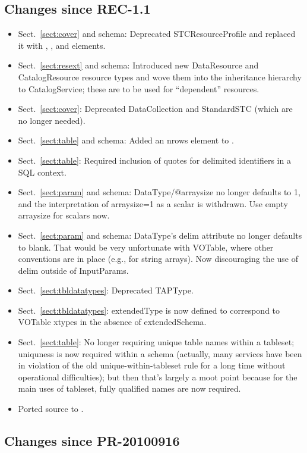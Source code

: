 \documentclass[11pt,a4paper]{ivoa}
\begin{document}
\subsection{Changes since REC-1.1}

\begin{itemize}
\item Sect.~\ref{sect:cover} and schema: Deprecated STCResourceProfile and replaced it with
, , and  elements.
\item Sect.~\ref{sect:resext} and schema: 
Introduced new DataResource and CatalogResource resource types
and wove them into the inheritance hierarchy to CatalogService; these
are to be used for ``dependent'' resources.
\item Sect.~\ref{sect:cover}:
Deprecated DataCollection and StandardSTC (which are no longer
needed).
\item Sect.~\ref{sect:table} 
and schema: Added an nrows element to .
\item Sect.~\ref{sect:table}: 
Required inclusion of quotes for delimited identifiers in a
SQL context.
\item Sect.~\ref{sect:param} and schema: 
DataType/@arraysize no longer defaults to 1, and the
interpretation of arraysize=1 as a scalar is withdrawn.  Use empty
arraysize for scalars now.
\item Sect.~\ref{sect:param} and schema:
DataType's delim attribute no longer defaults to blank.  That
would be very unfortunate with VOTable, where other conventions are in
place (e.g., for string arrays).  Now discouraging the use of delim
outside of InputParams.
\item Sect.~\ref{sect:tbldatatypes}: Deprecated TAPType.
\item Sect.~\ref{sect:tbldatatypes}: 
extendedType is now defined to correspond to VOTable xtypes in the
absence of extendedSchema.
\item Sect.~\ref{sect:table}: 
No longer requiring unique table names within a tableset;
uniquness is now required within a schema (actually, many services have
been in violation of the old unique-within-tableset rule for a long time
without operational difficulties); but then that's largely a moot point
because for the main uses of tableset, fully qualified names are now
required.
\item Ported source to \ivoatex.
\end{itemize}

\subsection{Changes since PR-20100916}
\end{document}
